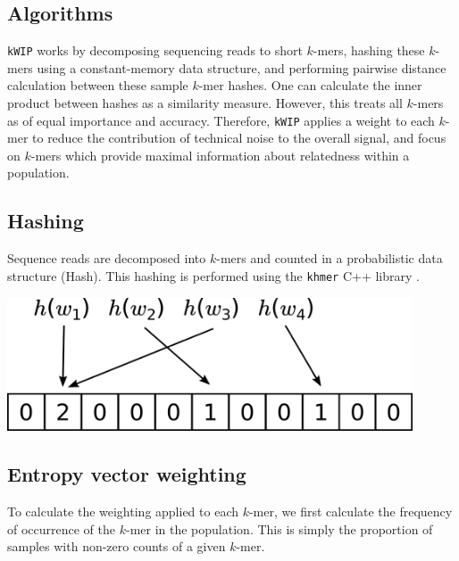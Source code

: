 \documentclass[a0,portrait]{a0poster}
\begin{document}
\begin{multicols}{2}
\section*{Algorithms}

\texttt{kWIP} works by decomposing sequencing reads to short $k$-mers, hashing
these $k$-mers using a constant-memory data structure, and performing pairwise
distance calculation between these sample $k$-mer hashes. One can calculate
the inner product between hashes as a similarity measure. However, this treats
all $k$-mers as of equal importance and accuracy. Therefore, \texttt{kWIP}
applies a weight to each $k$-mer to reduce the contribution of technical noise
to the overall signal, and focus on $k$-mers which provide maximal information
about relatedness within a population.


\subsection*{Hashing}

Sequence reads are decomposed into $k$-mers and counted in a probabilistic
data structure (Hash). This hashing is performed using the \texttt{khmer} C++
library \cite{crusoe_khmer_2015}.

\begin{center}
  \vspace{1cm}
  \includegraphics[width=12cm]{hashing.png}
  \vspace{1cm}
\end{center}

\subsection*{Entropy vector weighting}

To calculate the weighting applied to each $k$-mer, we first calculate the
frequency of occurrence of the $k$-mer in the population. This is simply the
proportion of samples with non-zero counts of a given $k$-mer.


\end{multicols}
\end{document}
